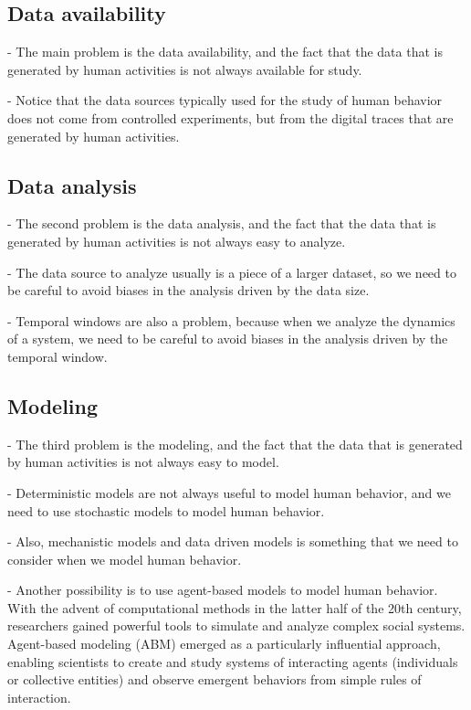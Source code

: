 \subsection{\label{subsec:Data availability} Data availability}

- The main problem is the data availability, and the fact that the data that is generated by human activities is not always available for study.

- Notice that the data sources typically used for the study of human behavior does not come from controlled experiments, but from the digital traces that are generated by human activities.

\subsection{\label{subsec:Data analysis} Data analysis}

- The second problem is the data analysis, and the fact that the data that is generated by human activities is not always easy to analyze.

- The data source to analyze usually is a piece of a larger dataset, so we need to be careful to avoid biases in the analysis driven by the data size.

- Temporal windows are also a problem, because when we analyze the dynamics of a system, we need to be careful to avoid biases in the analysis driven by the temporal window.

\subsection{\label{subsec:Modeling} Modeling}

- The third problem is the modeling, and the fact that the data that is generated by human activities is not always easy to model. 

- Deterministic models are not always useful to model human behavior, and we need to use stochastic models to model human behavior.

- Also, mechanistic models and data driven models is something that we need to consider when we model human behavior.

- Another possibility is to use agent-based models to model human behavior.
With the advent of computational methods in the latter half of the 20th century, researchers gained powerful tools to simulate and analyze complex social systems. Agent-based modeling (ABM) emerged as a particularly influential approach, enabling scientists to create and study systems of interacting agents (individuals or collective entities) and observe emergent behaviors from simple rules of interaction. 

